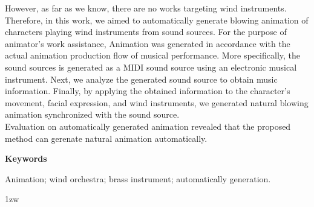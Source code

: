 %
However, as far as we know, there are no works targeting wind instruments.
%
Therefore, in this work, we aimed to automatically generate blowing animation of characters playing wind instruments from sound sources.
%
For the purpose of animator's work assistance, Animation was generated in accordance with the actual animation production flow of musical performance.
%
More specifically, the sound sources is generated as a MIDI sound source using an electronic musical instrument.
%
Next, we analyze the generated sound source to obtain music information.
%
Finally, by applying the obtained information to the character's movement, facial expression, 
and wind instruments, we generated natural blowing animation synchronized with the sound source.\\
\indent
%
Evaluation on automatically generated animation revealed that the proposed method can gerenate natural animation automatically.

\vspace{4ex}

\noindent
{\bf Keywords}

\noindent
Animation; wind orchestra; brass instrument; automatically generation.

\parindent 1zw